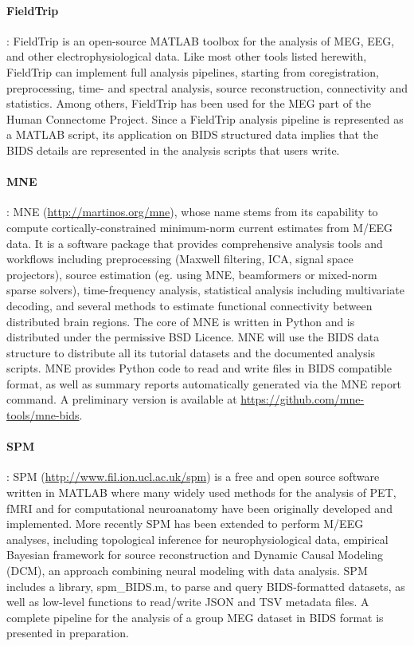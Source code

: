 \paragraph{FieldTrip}\citep{oostenveld2010fieldtrip}: FieldTrip is an open-source MATLAB toolbox for the analysis of MEG, EEG, and other electrophysiological data. Like most other tools listed herewith, FieldTrip can  implement full analysis pipelines, starting from coregistration, preprocessing, time- and spectral analysis, source reconstruction, connectivity and statistics. Among others, FieldTrip has been used for the MEG part of the Human Connectome Project. Since a FieldTrip analysis pipeline is represented as a MATLAB script, its application on BIDS structured data implies that the BIDS details are represented in the analysis scripts that users write. 

\paragraph{MNE}\citep{gramfort2013meg, mne}: MNE (\url{http://martinos.org/mne}), whose name stems from its capability to compute cortically-constrained minimum-norm current estimates from M/EEG data. It is a software package that provides comprehensive analysis tools and workflows including preprocessing (Maxwell filtering, ICA, signal space projectors), source estimation (eg. using MNE, beamformers or mixed-norm sparse solvers), time-frequency analysis, statistical analysis including multivariate decoding, and several methods to estimate functional connectivity between distributed brain regions. The core of MNE is written in Python and is distributed under the permissive BSD Licence. MNE will use the BIDS data structure to distribute all its tutorial datasets and the documented analysis scripts. MNE provides Python code to read and write files in BIDS compatible format, as well as summary reports automatically generated via the MNE report command. A preliminary version is available at \url{https://github.com/mne-tools/mne-bids}. 

\paragraph{SPM}\citep{litvak2011eeg}: SPM (\url{http://www.fil.ion.ucl.ac.uk/spm}) is a free and open source software written in MATLAB where many widely used methods for the analysis of PET, fMRI and for computational neuroanatomy have been originally developed and implemented. More recently SPM has been extended to perform M/EEG analyses, including topological inference for neurophysiological data, empirical Bayesian framework for source reconstruction and Dynamic Causal Modeling (DCM), an approach combining neural modeling with data analysis. SPM~\citep{litvak2011eeg} includes a library, spm\_BIDS.m, to parse and query BIDS-formatted datasets, as well as low-level functions to read/write JSON and TSV metadata files. A complete pipeline for the analysis of a group MEG dataset in BIDS format is presented in preparation.

